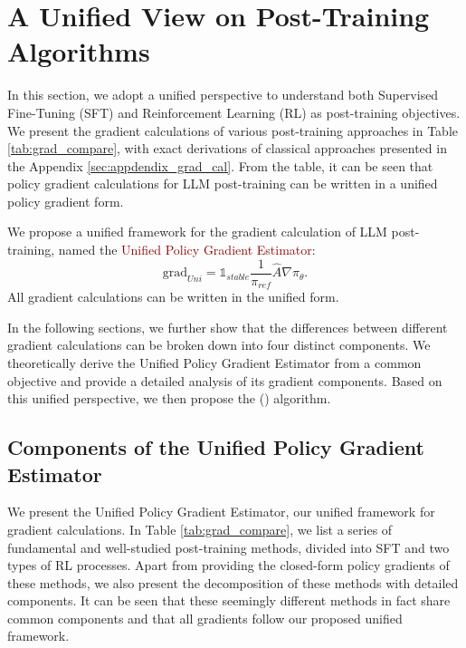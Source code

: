 \section{A Unified View on Post-Training Algorithms} \label{sec:unified-view}

In this section, we adopt a unified perspective to understand both Supervised Fine-Tuning (SFT) and Reinforcement Learning (RL) as post-training objectives.
We present the gradient calculations of various post-training approaches in Table \ref{tab:grad_compare}, with exact derivations of classical approaches presented in the Appendix \ref{sec:appdendix_grad_cal}. From the table, it can be seen that policy gradient calculations for LLM post-training can be written in a unified policy gradient form. 

\begin{tcolorbox}[takeawaysbox]
We propose a unified framework for the gradient calculation of LLM post-training, named the \textcolor{darkred}{Unified Policy Gradient Estimator}:
$$ \text{grad}_{Uni} = \mathbb{1}_{stable} \frac{1}{\pi_{ref}} \hat{A} \nabla \pi_{\theta}.$$All gradient calculations can be written in the unified form.
\end{tcolorbox}


In the following sections, we further show that the differences between different gradient calculations can be broken down into four distinct components.
We theoretically derive the Unified Policy Gradient Estimator from a common objective and provide a detailed analysis of its gradient components. Based on this unified perspective, we then propose the \method (\mot) algorithm.



\subsection{Components of the Unified Policy Gradient Estimator}
\label{Components of the Unified Policy Gradient Estimator}


We present the Unified Policy Gradient Estimator, our unified framework for gradient calculations. In Table \ref{tab:grad_compare}, we list a series of fundamental and well-studied post-training methods, divided into SFT and two types of RL processes. Apart from providing the closed-form policy gradients of these methods, we also present the decomposition of these methods with detailed components. It can be seen that these seemingly different methods in fact share common components and that all gradients follow our proposed unified framework.

